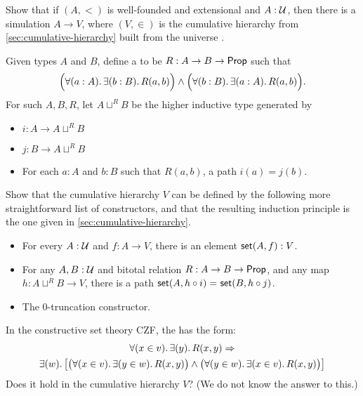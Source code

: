 \begin{ex}
  Show that if $(A,<)$ is well-founded and extensional and $A:\mathcal{U}$, then there is a simulation $A\to V$, where $(V,\in)$ is the cumulative hierarchy from \autoref{sec:cumulative-hierarchy} built from the universe \UU.
\end{ex}

\begin{ex}\label{ex:cumhierhit}
  Given types $A$ and $B$, define a  to be $R:A\to B\to \mathsf{Prop}$ such that
  \[ \Big(\fall{a:A}\exis{b:B} R(a,b) \Big) \land \Big(\fall{b:B}\exis{a:A} R(a,b) \Big). \]
  For such $A,B,R$, let $A\sqcup^R B$ be the higher inductive type generated by
  \begin{itemize}
  \item $i:A\to A\sqcup^R B$
  \item $j:B\to A\sqcup^R B$
  \item For each $a:A$ and $b:B$ such that $R(a,b)$, a path $i(a)=j(b)$.
  \end{itemize}
  Show that the cumulative hierarchy $V$ can be defined by the following more straightforward list of constructors, and that the resulting induction principle is the one given in \autoref{sec:cumulative-hierarchy}.
  \begin{itemize}
  \item For every $A : \mathcal{U}$ and $f : A \to V$, there is an element $\mathsf{set}(A, f) : V$.
  \item For any $A,B:\mathcal{U}$ and bitotal relation $R:A\to B\to \mathsf{Prop}$, and any map $h:A\sqcup^R B \to V$, there is a path $\mathsf{set}(A,h\circ i) =_{} \mathsf{set}(B,h\circ j)$.
  \item The 0-truncation constructor.
  \end{itemize}
\end{ex}

\begin{ex}
   In the constructive set theory CZF, the  has the form:
   \begin{multline*}
   \fall{x\in v}\exis{y} R(x,y) \Rightarrow \\
   \exis{w}\big[\big(\fall{x\in v}\exis{y\in w}R(x,y)\big)\land \big(\fall{y\in w}\exis{x\in v}R(x,y) \big)\big]
   \end{multline*}
   Does it hold in the cumulative hierarchy $V$?  (We do not know the answer to this.)
\end{ex}

